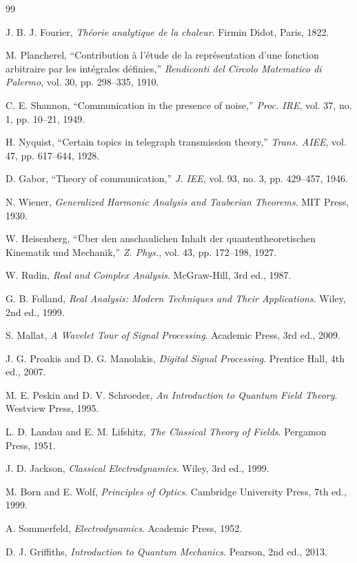 \documentclass[twocolumn,11pt,a4paper]{article}
\begin{document}
\begin{thebibliography}{99}

 J. B. J. Fourier, \emph{Théorie analytique de la chaleur}. Firmin Didot, Paris, 1822.

 M. Plancherel, ``Contribution à l'étude de la représentation d'une fonction arbitraire par les intégrales définies,'' \emph{Rendiconti del Circolo Matematico di Palermo}, vol. 30, pp. 298--335, 1910.

 C. E. Shannon, ``Communication in the presence of noise,'' \emph{Proc. IRE}, vol. 37, no. 1, pp. 10--21, 1949.

 H. Nyquist, ``Certain topics in telegraph transmission theory,'' \emph{Trans. AIEE}, vol. 47, pp. 617--644, 1928.

 D. Gabor, ``Theory of communication,'' \emph{J. IEE}, vol. 93, no. 3, pp. 429--457, 1946.

 N. Wiener, \emph{Generalized Harmonic Analysis and Tauberian Theorems}. MIT Press, 1930.

 W. Heisenberg, ``Über den anschaulichen Inhalt der quantentheoretischen Kinematik und Mechanik,'' \emph{Z. Phys.}, vol. 43, pp. 172--198, 1927.

 W. Rudin, \emph{Real and Complex Analysis}. McGraw-Hill, 3rd ed., 1987.

 G. B. Folland, \emph{Real Analysis: Modern Techniques and Their Applications}. Wiley, 2nd ed., 1999.

 S. Mallat, \emph{A Wavelet Tour of Signal Processing}. Academic Press, 3rd ed., 2009.

 J. G. Proakis and D. G. Manolakis, \emph{Digital Signal Processing}. Prentice Hall, 4th ed., 2007.

 M. E. Peskin and D. V. Schroeder, \emph{An Introduction to Quantum Field Theory}. Westview Press, 1995.

 L. D. Landau and E. M. Lifshitz, \emph{The Classical Theory of Fields}. Pergamon Press, 1951.

 J. D. Jackson, \emph{Classical Electrodynamics}. Wiley, 3rd ed., 1999.

 M. Born and E. Wolf, \emph{Principles of Optics}. Cambridge University Press, 7th ed., 1999.

 A. Sommerfeld, \emph{Electrodynamics}. Academic Press, 1952.

 D. J. Griffiths, \emph{Introduction to Quantum Mechanics}. Pearson, 2nd ed., 2013.

\end{thebibliography}
\end{document}

